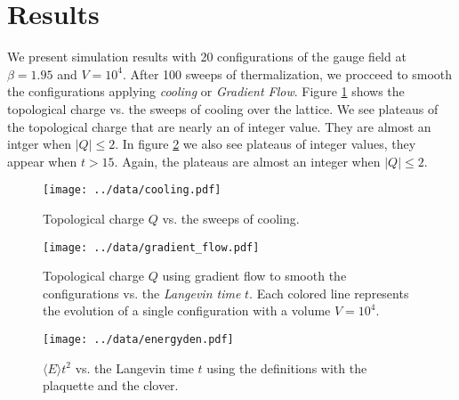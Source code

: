 \documentclass[12pt,a4paper]{article}
\begin{document}
\section{Results}
We present simulation results with 20 configurations of the gauge field at $\beta = 1.95$ and $V = 10^4$. After 100 sweeps of thermalization, we procceed to smooth the configurations applying \emph{cooling} or \emph{Gradient Flow}. Figure \ref{fig:cooling} shows the topological charge vs. the sweeps of cooling over the lattice. We see plateaus of the topological charge that are nearly an of integer value. They are almost an intger when $|Q| \leq 2$. In figure \ref{fig:gradient_flow} we also see plateaus of integer values, they appear when $t>15$. Again, the plateaus are almost an integer when $|Q|\leq 2$.
\begin{figure}

    \texttt{[image: ../data/cooling.pdf]}
    \caption{Topological charge $Q$ vs. the sweeps of cooling.}
    \label{fig:cooling}
\end{figure}

\begin{figure}
    \texttt{[image: ../data/gradient\_flow.pdf]}
    \caption{Topological charge $Q$ using gradient flow to smooth the configurations vs. the \emph{Langevin time} $t$. Each colored line represents the evolution of a single configuration with a volume $V = 10^{4}$.}
    \label{fig:gradient_flow}
\end{figure}

\begin{center}
\begin{figure}
    \texttt{[image: ../data/energyden.pdf]}
    \caption{$\langle E \rangle t^2$ vs. the Langevin time $t$ using the definitions with the plaquette and the clover.}
\end{figure}
\end{center}
\end{document}
